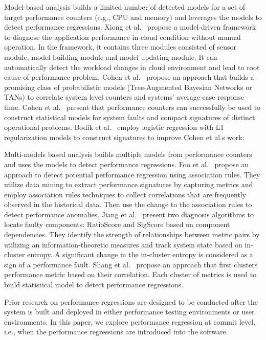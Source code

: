 Model-based analysis builds a limited number of detected models for a set of target performance counters (e.g., CPU and memory) and leverages the models to detect performance regressions. 
Xiong et al.~\cite{Xiong:2013:VAM} propose a model-driven framework to diagnose the application performance in cloud condition without manual operation. In the framework, it contains three modules consisted of sensor module, model building module and model updating module. It can automatically detect the workload changes in cloud environment and lead to root cause of performance problem. Cohen et al.~\cite{cohen2004correlating} propose an approach that builds  a promising class of probabilistic models (Tree-Augmented Bayesian Networks or TANs)  to correlate system level counters and systems’ average-case response time. Cohen et al.~\cite{Cohen:2005:CIC} present that performance counters can successfully be used to construct statistical models for system faults and compact signatures of distinct operational problems. Bodik et al.~\cite{bodik2008hilighter} employ logistic regression with L1 regularization models to construct signatures to improve Cohen et al.\textquotesingle s work.

Multi-models based analysis builds multiple models from performance counters and uses the models to detect performance regressions. Foo et al.~\cite{foo2010mining} propose an approach to detect potential performance regression using association rules. They utilize data mining to extract performance signatures by capturing metrics and employ association rules techniques to collect correlations that are frequently observed in the historical data. Then use the change to the association rules to detect performance anomalies. Jiang et al.~\cite{jiang2009automatic} present two diagnosis algorithms to locate faulty components: RatioScore and SigScore based on component dependencies. They identify the strength of relationships between metric pairs by utilizing an information-theoretic measures  and track system state based on in-cluster entropy. A significant change in the in-cluster entropy is considered as a sign of a performance fault. Shang et al.~\cite{Shang:2015:ADP} propose an approach that first clusters performance metric based on their correlation. Each cluster of metrics is used to build statistical model to detect performance regressions. 

Prior research on performance regressions are designed to be conducted after the system is built and deployed in either performance testing environments or user environments. In this paper, we explore performance regression at commit level, i.e., when the performance regressions are introduced into the software. 

